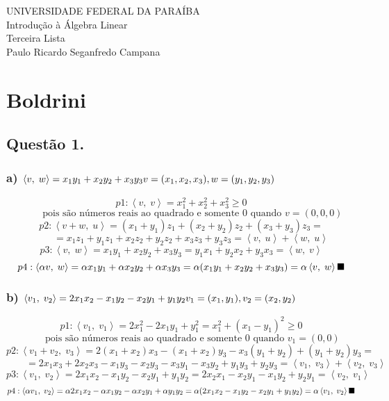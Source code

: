 \documentclass[12pt]{article}
\begin{document}
\setcounter{secnumdepth}{0}
\newcommand{\p}[2]{\left\langle#1,\;#2\right\rangle}
\begin{center}
	UNIVERSIDADE FEDERAL DA PARAÍBA\\
	Introdução à Álgebra Linear\\
	Terceira Lista\\
	Paulo Ricardo Seganfredo Campana
\end{center}

\section{Boldrini}
\subsection{Questão 1.}
\subsubsection{a) $\p{v}{w} = x_{1}y_{1} + x_{2}y_{2} + x_{3}y_{3} \hfill v = (x_{1},x_{2},x_{3}), w = (y_{1},y_{2},y_{3})$}

\[p1: \p{v}{v} = x_{1}^{2} + x_{2}^{2} + x_{3}^{2} \geq 0\]
\[\qquad \text{ pois são números reais ao quadrado e somente } 0 \text{ quando } v = (0,0,0)\]
\[p2: \p{v+w}{u} = (x_{1}+y_{1})z_{1} + (x_{2}+y_{2})z_{2} + (x_{3}+y_{3})z_{3} =\]
\[\qquad = x_{1}z_{1} + y_{1}z_{1} + x_{2}z_{2} + y_{2}z_{2} + x_{3}z_{3} + y_{3}z_{3} = \p{v}{u} + \p{w}{u}\]
\[p3: \p{v}{w} = x_{1}y_{1} + x_{2}y_{2} + x_{3}y_{3} = y_{1}x_{1} + y_{2}x_{2} + y_{3}x_{3} = \p{w}{v}\]
\[p4: \p{\alpha v}{w} = \alpha x_{1}y_{1} + \alpha x_{2}y_{2} + \alpha x_{3}y_{3} = \alpha(x_{1}y_{1} + x_{2}y_{2} + x_{3}y_{3}) = \alpha \p{v}{w} \hfill \blacksquare\]

\subsubsection{b) $\p{v_{1}}{v_{2}} = 2x_{1}x_{2} - x_{1}y_{2} - x_{2}y_{1} + y_{1}y_{2} \hfill v_{1} = (x_{1},y_{1}), v_{2} = (x_{2},y_{2})$}

\[p1: \p{v_{1}}{v_{1}} = 2x_{1}^{2} - 2x_{1}y_{1} + y_{1}^{2} = x_{1}^{2} + (x_{1}-y_{1})^{2} \geq 0\]
\[\qquad \text{ pois são números reais ao quadrado e somente } 0 \text{ quando } v_{1} = (0,0)\]
\[p2: \p{v_{1}+v_{2}}{v_{3}} = 2(x_{1}+x_{2})x_{3} - (x_{1}+x_{2})y_{3} - x_{3}(y_{1}+y_{2}) + (y_{1}+y_{2})y_{3} =\]
\[\qquad = 2x_{1}x_{3}+2x_{2}x_{3} - x_{1}y_{3}-x_{2}y_{3} - x_{3}y_{1}-x_{3}y_{2} + y_{1}y_{3}+y_{2}y_{3} = \p{v_{1}}{v_{3}} + \p{v_{2}}{v_{3}}\]
\[p3: \p{v_{1}}{v_{2}} = 2x_{1}x_{2} - x_{1}y_{2} - x_{2}y_{1} + y_{1}y_{2} = 2x_{2}x_{1} - x_{2}y_{1} - x_{1}y_{2} + y_{2}y_{1} = \p{v_{2}}{v_{1}}\]
\[p4: \p{\alpha v_{1}}{v_{2}} = \alpha2x_{1}x_{2} - \alpha x_{1}y_{2} - \alpha x_{2}y_{1} + \alpha y_{1}y_{2} = \alpha(2x_{1}x_{2} - x_{1}y_{2} - x_{2}y_{1} + y_{1}y_{2}) = \alpha \p{v_{1}}{v_{2}} \hfill \blacksquare\]
\end{document}
